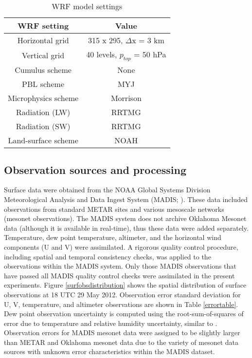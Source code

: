 \begin{table}
\centering
\begin{tabular}{ c || c }
{\bf WRF setting} & {\bf Value} \\ \hline \hline
Horizontal grid & 315 x 295, \(\Delta\)x = 3 km \\ \hline
Vertical grid & 40 levels, \(p_{top}\) = 50 hPa \\ \hline
Cumulus scheme & None \\ \hline
PBL scheme & MYJ \\ \hline
Microphysics scheme & Morrison \\ \hline
Radiation (LW) & RRTMG \\ \hline
Radiation (SW) & RRTMG \\ \hline
Land-surface scheme & NOAH \\ \hline
\end{tabular}
\caption{WRF model settings}
\label{wrftable}
\end{table}

\subsection{Observation sources and processing}
Surface data were obtained from the NOAA Global Systems Division Meteorological Analysis and Data Ingest System (MADIS; \citealt{madis}). These data included observations from standard METAR sites and various mesoscale networks (mesonet observations). The MADIS system does not archive Oklahoma Mesonet data (although it is available in real-time), thus these data were added separately. Temperature, dew point temperature, altimeter, and the horizontal wind components (U and V) were assimilated. A rigorous quality control procedure, including spatial and temporal consistency checks, was applied to the observations within the MADIS system. Only those MADIS observations that have passed all MADIS quality control checks were assimilated in the present experiments. Figure \ref{surfobsdistribution} shows the spatial distribution of surface observations at 18 UTC 29 May 2012. Observation error standard deviation for U, V, temperature, and altimeter observations are shown in Table \ref{errortable}. Dew point observation uncertainty is computed using the root-sum-of-squares of error due to temperature and relative humidity uncertainty, similar to \citet{linhubbard04}. Observation errors for MADIS mesonet data were assigned to be slightly larger than METAR and Oklahoma mesonet data due to the variety of mesonet data sources with unknown error characteristics within the MADIS dataset.

